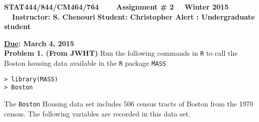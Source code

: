 \documentclass[11pt]{report}
\begin{document}
\begin{center}
{\bf STAT444/844/CM464/764 ~~~ Assignment \# 2 ~~Winter 2015 ~~Instructor: S. Chenouri}
{\bf Student: Christopher Alert : Undergraduate student}
\end{center} 
\noindent
{\bf \underline {Due}: March 4, 2015}\\

\noindent
{\bf Problem 1. (From JWHT)}   Run the following commands in {\tt R} to call the Boston housing data available in the {\tt R} package {\tt MASS}
\begin{verbatim}
> library(MASS)
> Boston
\end{verbatim}
The {\tt Boston} Housing data set includes 506 census tracts of Boston from the 1970 census. The following variables are recorded in this data set.
\end{document}
